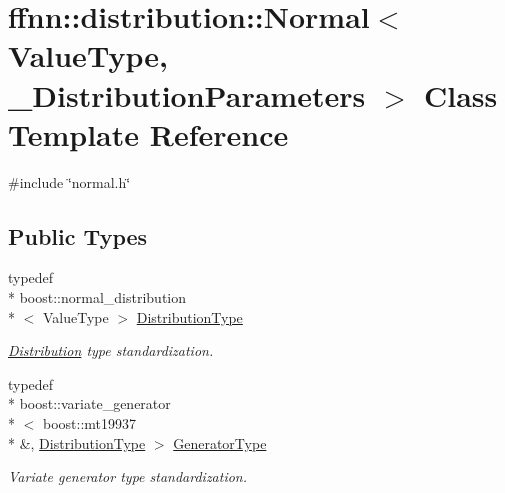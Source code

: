 \hypertarget{classffnn_1_1distribution_1_1_normal}{\section{ffnn\-:\-:distribution\-:\-:Normal$<$ Value\-Type, \-\_\-\-Distribution\-Parameters $>$ Class Template Reference}
\label{classffnn_1_1distribution_1_1_normal}
}


{\ttfamily \#include \char`\"{}normal.\-h\char`\"{}}

\subsection*{Public Types}
\begin{DoxyCompactItemize}
\item 
typedef \\*
boost\-::normal\-\_\-distribution\\*
$<$ Value\-Type $>$ \hyperlink{classffnn_1_1distribution_1_1_normal_ad56eafa8b2673bdb5092e47a0757e998}{Distribution\-Type}
\begin{DoxyCompactList}\small\item\em \hyperlink{classffnn_1_1distribution_1_1_distribution}{Distribution} type standardization. \end{DoxyCompactList}\item 
typedef \\*
boost\-::variate\-\_\-generator\\*
$<$ boost\-::mt19937 \\*
\&, \hyperlink{classffnn_1_1distribution_1_1_normal_ad56eafa8b2673bdb5092e47a0757e998}{Distribution\-Type} $>$ \hyperlink{classffnn_1_1distribution_1_1_normal_a1fcd4770f465ad858f33e1c40235f850}{Generator\-Type}
\begin{DoxyCompactList}\small\item\em Variate generator type standardization. \end{DoxyCompactList}\end{DoxyCompactItemize}
